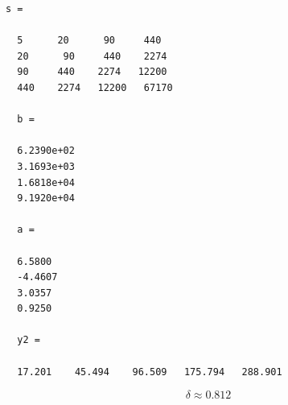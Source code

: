 \begin{lstlisting}[backgroundcolor=\color{cyan}]
  s =

  5      20      90     440
  20      90     440    2274
  90     440    2274   12200
  440    2274   12200   67170

  b =

  6.2390e+02
  3.1693e+03
  1.6818e+04
  9.1920e+04

  a =

  6.5800
  -4.4607
  3.0357
  0.9250

  y2 =

  17.201    45.494    96.509   175.794   288.901
\end{lstlisting}
\[
  \delta \approx 0.812
\]
